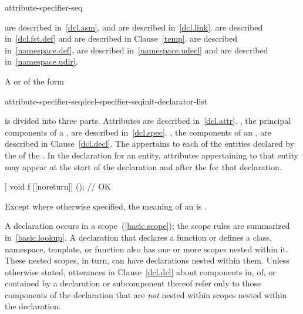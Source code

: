\begin{bnf}
\br
    \terminal{;}
\end{bnf}

\begin{bnf}
\br
    attribute-specifier-seq \terminal{;}
\end{bnf}

\enternote
{} are described in~\ref{dcl.asm}, and
 are described in~\ref{dcl.link}.
 are described in~\ref{dcl.fct.def} and
 are described in Clause~\ref{temp}.
 are described in~\ref{namespace.def},
 are described in~\ref{namespace.udecl} and
 are described in~\ref{namespace.udir}.
\exitnote

\pnum
A
 or
 of the form

\begin{ncsimplebnf}
attribute-specifier-seq\opt decl-specifier-seq\opt init-declarator-list\opt{} \terminal{;}
\end{ncsimplebnf}

is divided into three parts.
Attributes are described in~\ref{dcl.attr}.
, the principal components of
a , are described in~\ref{dcl.spec}.
, the components of an
, are described in Clause~\ref{dcl.decl}.
The 
appertains to each of the entities declared by
the 
of the .
\enternote In the declaration for an entity, attributes appertaining to that
entity may appear at the start of the declaration and after the
 for that declaration.
\exitnote \enterexample
\begin{codeblock}
[[noreturn]] void f [[noreturn]] (); // OK
\end{codeblock}
\exitexample

\pnum
Except where otherwise specified, the meaning of an 
is .

\pnum
{}%
%
A declaration occurs in a scope~(\ref{basic.scope}); the scope rules are
summarized in~\ref{basic.lookup}. A declaration that declares a function
or defines a class, namespace, template, or function also has one or
more scopes nested within it. These nested scopes, in turn, can have
declarations nested within them. Unless otherwise stated, utterances in
Clause~\ref{dcl.dcl} about components in, of, or contained by a
declaration or subcomponent thereof refer only to those components of
the declaration that are \emph{not} nested within scopes nested within
the declaration.


